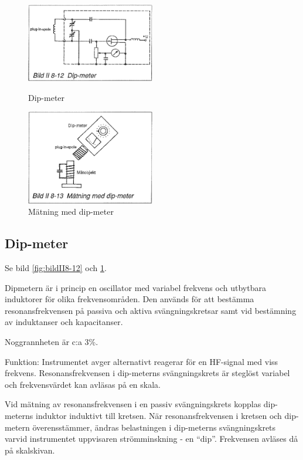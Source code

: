 \begin{figure}
  \includegraphics[width=0.5\textwidth]{images/bild_2_8-12}
  \caption{Dip-meter}
  \label{fig:bildII8-12}

  \includegraphics[width=0.5\textwidth]{images/bild_2_8-13}
  \caption{Mätning med dip-meter}
  \label{fig:bildII8-13}
\end{figure}

\subsection{Dip-meter}

Se bild \ref{fig:bildII8-12} och \ref{fig:bildII8-13}.

Dipmetern är i princip en oscillator med variabel frekvens och
utbytbara induktorer för olika frekvensområden.  Den används för att
bestämma resonansfrekvensen på passiva och aktiva svängningskretsar
samt vid bestämning av induktanser och kapacitanser.

Noggrannheten är c:a 3\%.

Funktion: Instrumentet avger alternativt reagerar för en HF-signal med
viss frekvens.  Resonansfrekvensen i dip-meterns svängningskrets är
steglöst variabel och frekvensvärdet kan avläsas på en skala.

Vid mätning av resonansfrekvensen i en passiv svängningskrets kopplas
dip-meterns induktor induktivt till kretsen. När resonansfrekvensen i
kretsen och dip-metern överensstämmer, ändras belastningen i
dip-meterns svängningskrets varvid instrumentet uppvisaren
strömminskning - en ``dip''. Frekvensen avläses då på skalskivan.

